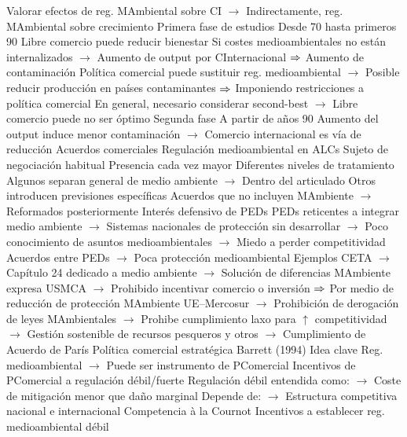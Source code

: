 \documentclass{nuevotema}
\begin{document}
\begin{esquemal}
				\4[] Valorar efectos de reg. MAmbiental sobre CI
				\4[] $\to$ Indirectamente, reg. MAmbiental sobre crecimiento
				\4 Primera fase de estudios
				\4[] Desde 70 hasta primeros 90
				\4[] Libre comercio puede reducir bienestar
				\4[] Si costes medioambientales no están internalizados
				\4[] $\to$ Aumento de output por CInternacional
				\4[] $\Rightarrow$ Aumento de contaminación
				\4[] Política comercial puede sustituir reg. medioambiental
				\4[] $\to$ Posible reducir producción en países contaminantes
				\4[] $\Rightarrow$ Imponiendo restricciones a política comercial
				\4[] En general, necesario considerar second-best
				\4[] $\to$ Libre comercio puede no ser óptimo
				\4 Segunda fase
				\4[] A partir de años 90
				\4[] Aumento del output induce menor contaminación
				\4[] $\to$ Comercio internacional es vía de reducción
			\3 Acuerdos comerciales
				\4 Regulación medioambiental en ALCs
				\4[] Sujeto de negociación habitual
				\4[] Presencia cada vez mayor
				\4 Diferentes niveles de tratamiento
				\4[] Algunos separan general de medio ambiente
				\4[] $\to$ Dentro del articulado
				\4[] Otros introducen previsiones específicas
				\4[] Acuerdos que no incluyen MAmbiente
				\4[] $\to$ Reformados posteriormente
				\4 Interés defensivo de PEDs
				\4[] PEDs reticentes a integrar medio ambiente
				\4[] $\to$ Sistemas nacionales de protección sin desarrollar
				\4[] $\to$ Poco conocimiento de asuntos medioambientales
				\4[] $\to$ Miedo a perder competitividad
				\4[] Acuerdos entre PEDs
				\4[] $\to$ Poca protección medioambiental
				\4 Ejemplos
				\4[] CETA
				\4[] $\to$ Capítulo 24 dedicado a medio ambiente
				\4[] $\to$ Solución de diferencias MAmbiente expresa
				\4[] USMCA
				\4[] $\to$ Prohibido incentivar comercio o inversión
				\4[] $\Rightarrow$ Por medio de reducción de protección MAmbiente
				\4[] UE--Mercosur
				\4[] $\to$ Prohibición de derogación de leyes MAmbientales
				\4[] $\to$ Prohibe cumplimiento laxo para $\uparrow$ competitividad
				\4[] $\to$ Gestión sostenible de recursos pesqueros y otros
				\4[] $\to$ Cumplimiento de Acuerdo de París
			\3 Política comercial estratégica
				\4 Barrett (1994)
				\4 Idea clave
				\4[] Reg. medioambiental
				\4[] $\to$ Puede ser instrumento de PComercial
				\4 Incentivos de PComercial a regulación débil/fuerte
				\4[] Regulación débil entendida como:
				\4[] $\to$ Coste de mitigación menor que daño marginal
				\4[] Depende de:
				\4[] $\to$ Estructura competitiva nacional e internacional
				\4 Competencia à la Cournot
				\4[] Incentivos a establecer reg. medioambiental débil

\end{esquemal}
\end{document}
